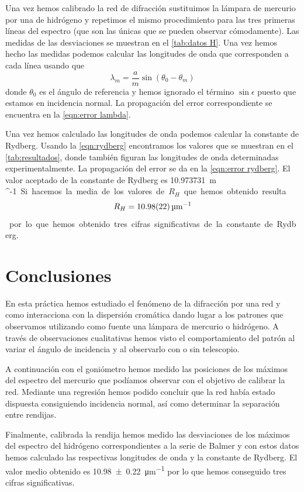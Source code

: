 \documentclass[12pt]{article}
\numberwithin{table}{section}
\numberwithin{figure}{section}
\numberwithin{equation}{section}
\newcommand{\data}[3]{\SI{#1 \pm #2}{#3}}
\begin{document}
Una vez hemos calibrado la red de difracción sustituimos la lámpara de mercurio por una de hidrógeno y repetimos el mismo procedimiento para las tres primeras líneas del espectro (que son las únicas que se pueden observar cómodamente). Las medidas de las desviaciones se muestran en el \cref{tab:datos H}. Una vez hemos hecho las medidas podemos calcular las longitudes de onda que corresponden a cada línea usando que
\begin{equation} \label{eqn:calculo lambda}
	\lambda_m = \frac{a}{m} \sin{(\theta_0 - \theta_m)}
\end{equation}
donde \( \theta_0 \) es el ángulo de referencia y hemos ignorado el término \( \sin{\epsilon} \) puesto que estamos en incidencia normal. La propagación del error correspondiente se encuentra en la \cref{eqn:error lambda}.

Una vez hemos calculado las longitudes de onda podemos calcular la constante de Rydberg. Usando la \cref{eqn:rydberg} encontramos los valores que se muestran en el \cref{tab:resultados}, donde también figuran las longitudes de onda determinadas experimentalmente. La propagación del error se da en la \cref{eqn:error rydberg}. El valor aceptado de la constante de Rydberg es \SI{10.973731}{\micro m ^{-1}}. Si hacemos la media de los valores de \( R_H \) que hemos obtenido resulta
\begin{equation*} 
	R_H = \data{10.98}{0.22}{\micro m^{-1}}
\end{equation*}
por lo que hemos obtenido tres cifras significativas de la constante de Rydberg.

\section{Conclusiones}
En esta práctica hemos estudiado el fenómeno de la difracción por una red y como interacciona con la dispersión cromática dando lugar a los patrones que observamos utilizando como fuente una lámpara de mercurio o hidrógeno. A través de observaciones cualitativas hemos visto el comportamiento del patrón al variar el ángulo de incidencia y al observarlo con o sin telescopio.

A continuación con el goniómetro hemos medido las posiciones de los máximos del espectro del mercurio que podíamos observar con el objetivo de calibrar la red. Mediante una regresión hemos podido concluir que la red había estado dispuesta consiguiendo incidencia normal, así como determinar la separación entre rendijas.

Finalmente, calibrada la rendija hemos medido las desviaciones de los máximos del espectro del hidrógeno correspondientes a la serie de Balmer y con estos datos hemos calculado las respectivas longitudes de onda y la constante de Rydberg. El valor medio obtenido es \data{10.98}{0.22}{\micro m^{-1}} por lo que hemos conseguido tres cifras significativas.
\end{document}
